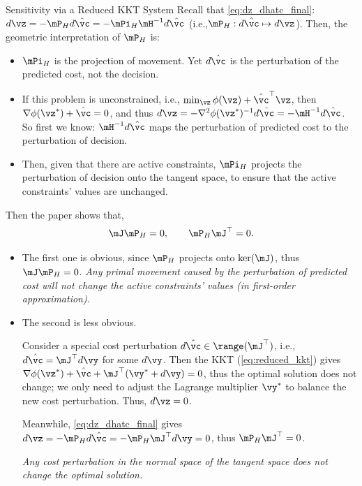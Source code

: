 \documentclass[10pt,aspectratio=169,xcolor=dvipsnames]{beamer}
\begin{document}
\begin{frame}[allowframebreaks]{Sensitivity via a Reduced KKT System}
    Recall that \eqref{eq:dz_dhatc_final}: $d\vz = -\mP_H d\hat{\vc} = -\mPi_H \mH^{-1} d\hat{\vc}$ (i.e.,$\mP_H: d\hat{\vc} \mapsto d\vz$). Then, the geometric interpretation of $\mP_H$ is:
    \begin{itemize}
        \item $\mPi_H$ is the projection of movement. Yet $d\hat{\vc}$ is the perturbation of the predicted cost, not the decision.
        \item If this problem is unconstrained, i.e., $\min_{\vz} \phi(\vz) + \hat{\vc}^\top \vz$, then $\nabla \phi(\vz^*) + \hat{\vc} = 0$, and thus $d\vz = - \nabla^2 \phi(\vz^*)^{-1} d\hat{\vc} = -\mH^{-1} d\hat{\vc}$. So first we know: $\mH^{-1} d\hat{\vc}$ maps the perturbation of predicted cost to the perturbation of decision.
        \item Then, given that there are active constraints, $\mPi_H$ projects the perturbation of decision onto the tangent space, to ensure that the active constraints' values are unchanged.
    \end{itemize}

    \break

    Then the paper shows that,
    \begin{equation}
        {\mJ \mP_H = 0 , \qquad \mP_H \mJ^\top = 0}.
    \end{equation}
    \begin{itemize}
        \item The first one is obvious, since $\mP_H$ projects onto $\ker(\mJ)$, thus $\mJ \mP_H = 0$. \emph{Any primal movement caused by the perturbation of predicted cost will not change the active constraints' values (in first-order approximation).}
        \item The second is less obvious.

        Consider a special cost perturbation $d\hat{\vc} \in \range(\mJ^\top)$, i.e., $d\hat{\vc} = \mJ^\top d\vy$ for some $d\vy$. Then the KKT (\eqref{eq:reduced_kkt}) gives $\nabla \phi(\vz^*) + \hat{\vc} + \mJ^\top (\vy^* + d\vy) = 0$, thus the optimal solution does not change; we only need to adjust the Lagrange multiplier $\vy^*$ to balance the new cost perturbation. Thus, $d\vz = 0$.

        Meanwhile, \eqref{eq:dz_dhatc_final} gives $d\vz = -\mP_H d\hat{\vc} = -\mP_H \mJ^\top d\vy = 0$, thus $\mP_H \mJ^\top = 0$.

        \emph{Any cost perturbation in the normal space of the tangent space does not change the optimal solution.}
    \end{itemize}


\end{frame}
\end{document}

